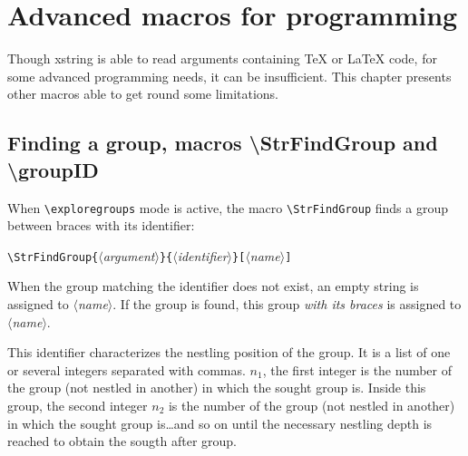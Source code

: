 \documentclass[a4paper,10pt]{article}
\newcommand\argu[1]{$\langle$\textit{#1}$\rangle$}
\newcommand\ARGU[1]{\texttt{\{}\argu{#1}\texttt{\}}}
\newcommand\arguC[1]{\texttt{[}\argu{#1}\texttt{]}}
\newcommand\Xstring{\textsf{xstring}\xspace}
\newcommand\verbinline{\lstinline[basicstyle=\normalsize\ttfamily]}
\begin{document}
\section{Advanced macros for programming}
Though \Xstring is able to read arguments containing \TeX{} or \LaTeX{} code, for some advanced programming needs, it can be insufficient. This chapter presents other macros able to get round some limitations.

\subsection{Finding a group, macros {\ttfamily\textbackslash StrFindGroup} and {\ttfamily\textbackslash groupID}}
When \verbinline=\exploregroups= mode is active, the macro \verbinline=\StrFindGroup= finds a group between braces with its identifier:\smallskip

\verbinline|\StrFindGroup|\ARGU{argument}\ARGU{identifier}\arguC{name}\medskip

When the group matching the identifier does not exist, an empty string is assigned to \argu{name}. If the group is found, this group \emph{with its braces} is assigned to \argu{name}.\smallskip

This identifier characterizes the nestling position of the group. It is a list of one or several integers separated with commas. $n_1$, the first integer is the number of the group (not nestled in another) in which the sought group is. Inside this group, the second integer $n_2$ is the number of the group (not nestled in another) in which the sought group is\ldots and so on until the necessary nestling depth is reached to obtain the sougth after group.\bigskip
\end{document}
